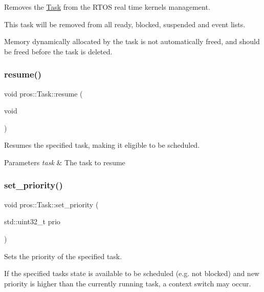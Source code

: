 Removes the \hyperlink{classpros_1_1Task}{Task} from the R\+T\+OS real time kernel\textquotesingle{}s management. 

This task will be removed from all ready, blocked, suspended and event lists.

Memory dynamically allocated by the task is not automatically freed, and should be freed before the task is deleted. \mbox{\label{classpros_1_1Task_ada2c08d04b39f11582cea90b59b8f317}} 
\subsubsection{\texorpdfstring{resume()}{resume()}}
{\footnotesize\ttfamily void pros\+::\+Task\+::resume (\begin{DoxyParamCaption}\item[{void}]{ }\end{DoxyParamCaption})}



Resumes the specified task, making it eligible to be scheduled. 


\begin{DoxyParams}{Parameters}
{\em task} & The task to resume \\
\hline
\end{DoxyParams}
\mbox{\label{classpros_1_1Task_a205a9937d34311ba10f540bc58d0b0b9}} 
\subsubsection{\texorpdfstring{set\+\_\+priority()}{set\_priority()}}
{\footnotesize\ttfamily void pros\+::\+Task\+::set\+\_\+priority (\begin{DoxyParamCaption}\item[{std\+::uint32\+\_\+t}]{prio }\end{DoxyParamCaption})}



Sets the priority of the specified task. 

If the specified task\textquotesingle{}s state is available to be scheduled (e.\+g. not blocked) and new priority is higher than the currently running task, a context switch may occur.


